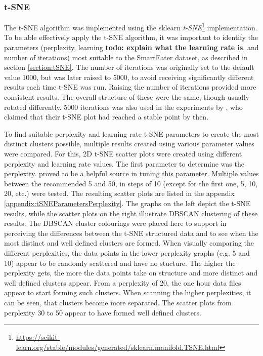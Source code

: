 \subsubsection{t-SNE}
\label{section:experimentTSNE}
The t-SNE algorithm was implemented using the sklearn \textit{t-SNE}\footnote{\url{https://scikit-learn.org/stable/modules/generated/sklearn.manifold.TSNE.html}} implementation.
To be able effectively apply the t-SNE algorithm, it was important to identify the parameters (perplexity, learning \textbf{todo: explain what the learning rate is}, and number of iterations) most suitable to the SmartEater dataset, as described in section \ref{section:tSNE}. The number of iterations was originally set to the default value 1000, but was later raised to 5000, to avoid receiving significantly different results each time t-SNE was run. Raising the number of iterations provided more consistent results. The overall structure of these were the same, though usually rotated differently. 5000 iterations was also used in the experiments by \textcite{wattenberg2016how}, who claimed that their t-SNE plot had reached a stable point by then.

To find suitable perplexity and learning rate t-SNE parameters to create the most distinct clusters possible, multiple results created using various parameter values were compared. For this, 2D t-SNE scatter plots were created using different perplexity and learning rate values. 
The first parameter to determine was the perplexity. \textcite{wattenberg2016how} proved to be a helpful source in tuning this parameter. Multiple values between the recommended 5 and 50, in steps of 10 (except for the first one, 5, 10, 20, etc.) were tested. The resulting scatter plots are listed in the appendix \ref{appendix:tSNEParametersPerplexity}. The graphs on the left depict the t-SNE results, while the scatter plots on the right illustrate DBSCAN clustering of these results. The DBSCAN cluster colourings were placed here to support in perceiving the differences between the t-SNE structured data and to see when the most distinct and well defined clusters are formed. When visually comparing the different perplexities, the data points in the lower perplexity graphs (e.g. 5 and 10) appear to be randomly scattered and have no stucture. The higher the perplexity gets, the more the data points take on structure and more distinct and well defined clusters appear. From a perplexity of 20, the one hour data files appear to start forming such clusters. When scanning the higher perplexities, it can be seen, that clusters become more separated. The scatter plots from perplexity 30 to 50 appear to have formed well defined clusters. 

